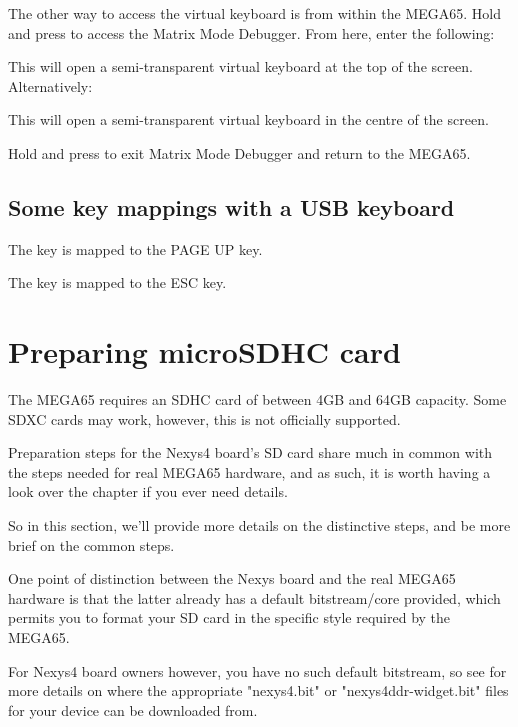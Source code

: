 The other way to access the virtual keyboard is from within the MEGA65. Hold \megasymbolkey and press  to access the Matrix Mode Debugger. From here, enter the following:


This will open a semi-transparent virtual keyboard at the top of the screen. Alternatively:


This will open a semi-transparent virtual keyboard in the centre of the screen.

Hold \megasymbolkey and press  to exit Matrix Mode Debugger and return to the MEGA65.

\subsection{Some key mappings with a USB keyboard}

The  key is mapped to the PAGE UP key.

The   key is mapped to the ESC key.

\newpage

\section{Preparing microSDHC card}

The MEGA65 requires an SDHC card of between 4GB and 64GB capacity.  Some SDXC cards may work, however, this is not officially supported.

Preparation steps for the Nexys4 board's SD card share much in common with the steps needed for real MEGA65 hardware, and as such, it is worth having a look over the  chapter if you ever need details.

So in this section, we'll provide more details on the distinctive steps, and be more brief on the common steps.

One point of distinction between the Nexys board and the real MEGA65 hardware is that the latter already has a default bitstream/core provided, which permits you to format your SD card in the specific style required by the MEGA65.

For Nexys4 board owners however, you have no such default bitstream, so
see  for more details on where the appropriate "nexys4.bit" or "nexys4ddr-widget.bit" files for your device can be downloaded from.

